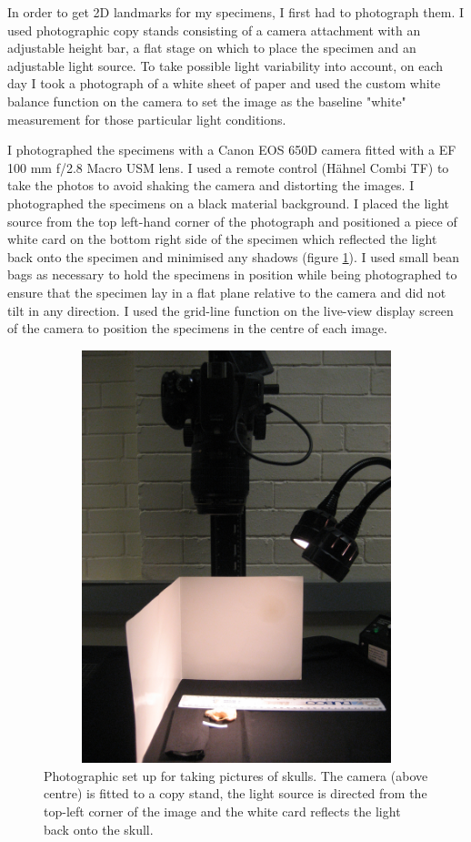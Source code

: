 	In order to get 2D landmarks for my specimens, I first had to photograph them. I used photographic copy stands consisting of a camera attachment with an adjustable height bar, a flat stage on which to place the specimen and an adjustable light source. To take possible light variability into account, on each day I took a photograph of a white sheet of paper and used the custom white balance function on the camera to set the image as the baseline "white" measurement for those particular light conditions.
	
	I photographed the specimens with a Canon EOS 650D camera fitted with a EF 100 mm f/2.8 Macro USM lens. I used a remote control (H\"ahnel Combi TF) to take the photos to avoid shaking the camera and distorting the images. I photographed the specimens on a black material background. I placed the light source from the top left-hand corner of the photograph and positioned a piece of white card on the bottom right side of the specimen which reflected the light back onto the specimen and minimised any shadows (figure \ref{fig:camera}). I used small bean bags as necessary to hold the specimens in position while being photographed to ensure that the specimen lay in a flat plane relative to the camera and did not tilt in any direction. I used the grid-line function on the live-view display screen of the camera to position the specimens in the centre of each image. 

\begin{figure}[h] 
  \centering
  \includegraphics[width=12cm, height=12cm, keepaspectratio=true]{Methods/figures/camera.jpg}
    \caption[Photographic set up]
    {Photographic set up for taking pictures of skulls. The camera (above centre) is fitted to a copy stand, the light source is directed from the top-left corner of the image and the white card reflects the light back onto the skull. }
  \label{fig:camera}
  \end{figure}

